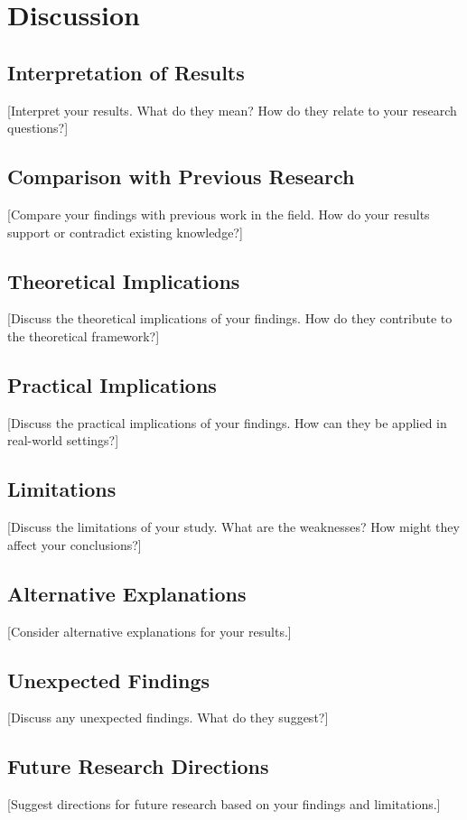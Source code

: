 
\section{Discussion}
\label{sec:discussion}

\subsection{Interpretation of Results}
[Interpret your results. What do they mean? How do they relate to your research questions?]

\subsection{Comparison with Previous Research}
[Compare your findings with previous work in the field. How do your results support or contradict existing knowledge?]

\subsection{Theoretical Implications}
[Discuss the theoretical implications of your findings. How do they contribute to the theoretical framework?]

\subsection{Practical Implications}
[Discuss the practical implications of your findings. How can they be applied in real-world settings?]

\subsection{Limitations}
[Discuss the limitations of your study. What are the weaknesses? How might they affect your conclusions?]

\subsection{Alternative Explanations}
[Consider alternative explanations for your results.]

\subsection{Unexpected Findings}
[Discuss any unexpected findings. What do they suggest?]

\subsection{Future Research Directions}
[Suggest directions for future research based on your findings and limitations.]